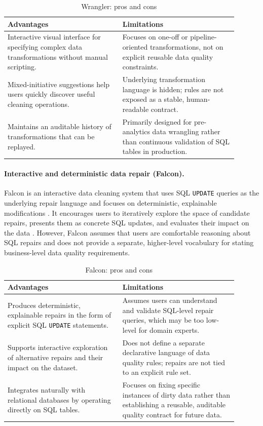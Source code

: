 \begin{table}[h]
\centering
\caption{Wrangler: pros and cons}
\begin{tabular}{|p{0.45\linewidth}| p{0.45\linewidth}|}
\hline
\textbf{Advantages} & \textbf{Limitations} \\
\hline
Interactive visual interface for specifying complex data transformations without manual scripting. &
Focuses on one-off or pipeline-oriented transformations, not on explicit reusable data quality constraints. \\
Mixed-initiative suggestions help users quickly discover useful cleaning operations. &
Underlying transformation language is hidden; rules are not exposed as a stable, human-readable contract. \\
Maintains an auditable history of transformations that can be replayed. &
Primarily designed for pre-analytics data wrangling rather than continuous validation of SQL tables in production. \\
\hline
\end{tabular}
\end{table}

\paragraph{Interactive and deterministic data repair (Falcon).}
Falcon is an interactive data cleaning system that uses SQL \texttt{UPDATE} queries as the underlying repair language and focuses on deterministic, explainable modifications \cite{falcon}. 
It encourages users to iteratively explore the space of candidate repairs, presents them as concrete SQL updates, and evaluates their impact on the data \cite{falcon}. 
However, Falcon assumes that users are comfortable reasoning about SQL repairs and does not provide a separate, higher-level vocabulary for stating business-level data quality requirements. 

\begin{table}[h]
\centering
\caption{Falcon: pros and cons}
\begin{tabular}{|p{0.45\linewidth}| p{0.45\linewidth}|}
\hline
\textbf{Advantages} & \textbf{Limitations} \\
\hline
Produces deterministic, explainable repairs in the form of explicit SQL \texttt{UPDATE} statements. &
Assumes users can understand and validate SQL-level repair queries, which may be too low-level for domain experts. \\
Supports interactive exploration of alternative repairs and their impact on the dataset. &
Does not define a separate declarative language of data quality rules; repairs are not tied to an explicit rule set. \\
Integrates naturally with relational databases by operating directly on SQL tables. &
Focuses on fixing specific instances of dirty data rather than establishing a reusable, auditable quality contract for future data. \\
\hline
\end{tabular}
\end{table}

